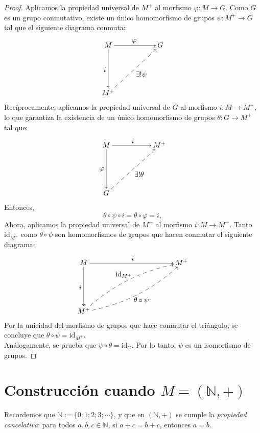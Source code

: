 \begin{proof}
	Aplicamos la propiedad universal de \( M^+ \) al morfismo \( \varphi : M \to G \). Como \( G \) es un grupo conmutativo, existe un único homomorfismo de grupos \( \psi : M^+ \to G \) tal que el siguiente diagrama conmuta:
	\[
	\xymatrix{
		M \ar[rr]^{\displaystyle \varphi} \ar[dd]_{\displaystyle i} & & G \\
		&&\\
		M^+ \ar@{-->}[rruu]_{\displaystyle \exists! \psi} &&
	}
	\]	Recíprocamente, aplicamos la propiedad universal de \( G \) al morfismo \( i : M \to M^+ \), lo que garantiza la existencia de un único homomorfismo de grupos \( \theta : G \to M^+ \) tal que:
	\[
	\xymatrix{
		M \ar[rr]^{\displaystyle i} \ar[dd]_{\displaystyle \varphi} & & M^+ \\
		&&\\
		G \ar@{-->}[rruu]_{\displaystyle \exists! \theta} &&
	}
	\]
	Entonces,
	\[
	\theta \circ \psi \circ i = \theta \circ \varphi = i,
	\]
	Ahora, aplicamos la propiedad universal de \( M^+ \) al morfismo \( i : M \to M^+ \). Tanto \( \mathrm{id}_{M^+} \) como \( \theta \circ \psi \) son homomorfismos de grupos que hacen conmutar el siguiente diagrama:
	\[
	\xymatrix{
		M \ar[rrrr]^{\displaystyle i} \ar[dd]_{\displaystyle i} & &&& M^+ \\
		&&&&\\
		M^+ \ar@{-->}@/^1pc/[rrrruu]^{\displaystyle \mathrm{id}_{M^+}} \ar@{-->}@/_1pc/[rrrruu]_{\displaystyle \theta \circ \psi} &&&&
	}
	\] Por la unicidad del morfismo de grupos que hace conmutar el triángulo, se concluye que \( \theta \circ \psi = \mathrm{id}_{M^+} \).\\
	
	\noindent Análogamente, se prueba que \( \psi \circ \theta = \mathrm{id}_G \). Por lo tanto, \( \psi \) es un isomorfismo de grupos.
\end{proof}






\section{Construcción cuando \( M = (\mathbb{N}, +) \)}

\noindent Recordemos que \( \mathbb{N} := \{0; 1; 2; 3; \cdots\} \), y que en \( (\mathbb{N}, +) \) se cumple la \emph{propiedad cancelativa}: para todos \( a, b, c \in \mathbb{N} \), si \( a + c = b + c \), entonces \( a = b \).\\

